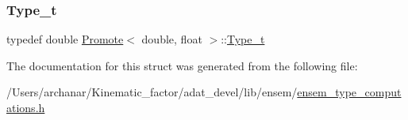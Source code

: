 \subsubsection{\texorpdfstring{Type\_t}{Type\_t}\hspace{0.1cm}{\footnotesize\ttfamily [2/2]}}
{\footnotesize\ttfamily typedef double \mbox{\hyperlink{structPromote}{Promote}}$<$ double, float $>$\+::\mbox{\hyperlink{structPromote_3_01double_00_01float_01_4_a13a1db5ec3dbe8a0dbe04bfa1602202c}{Type\+\_\+t}}}



The documentation for this struct was generated from the following file\+:\begin{DoxyCompactItemize}
\item 
/\+Users/archanar/\+Kinematic\+\_\+factor/adat\+\_\+devel/lib/ensem/\mbox{\hyperlink{lib_2ensem_2ensem__type__computations_8h}{ensem\+\_\+type\+\_\+computations.\+h}}\end{DoxyCompactItemize}
